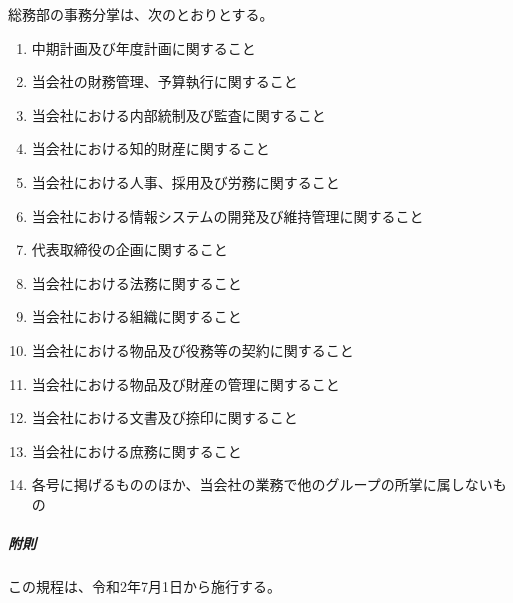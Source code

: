 \documentclass[10pt,a4paper,uplatex]{jsarticle}
\begin{document}
総務部の事務分掌は、次のとおりとする。
\begin{enumerate}
	\item 中期計画及び年度計画に関すること
	\item 当会社の財務管理、予算執行に関すること
	\item 当会社における内部統制及び監査に関すること
	\item 当会社における知的財産に関すること
	\item 当会社における人事、採用及び労務に関すること
	\item 当会社における情報システムの開発及び維持管理に関すること
	\item 代表取締役の企画に関すること
	\item 当会社における法務に関すること
	\item 当会社における組織に関すること
	\item 当会社における物品及び役務等の契約に関すること
	\item 当会社における物品及び財産の管理に関すること
	\item 当会社における文書及び捺印に関すること
	\item 当会社における庶務に関すること
	\item 各号に掲げるもののほか、当会社の業務で他のグループの所掌に属しないもの
\end{enumerate}

\vspace{1cm}
\subparagraph{附則}
この規程は、令和2年7月1日から施行する。
\end{document}
